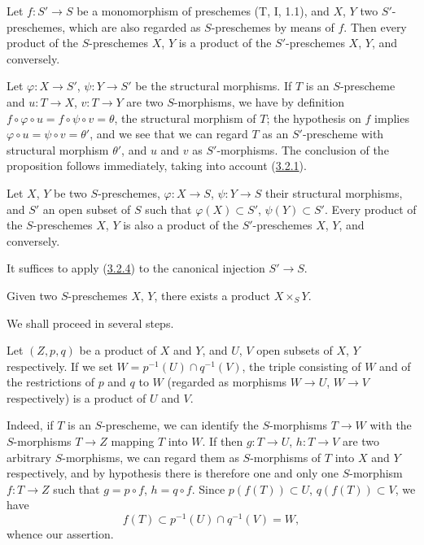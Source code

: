 \begin{proposition}[3.2.4]
\label{I.3.2.4}
Let $f:S'\to S$ be a monomorphism of preschemes (T, I, 1.1), and $X$, $Y$ two
$S'$-preschemes, which are also regarded as $S$-preschemes by means of
$f$. Then every product of the $S$-preschemes $X$, $Y$ is a product of the
$S'$-preschemes $X$, $Y$, and conversely.
\end{proposition}

Let $\varphi:X\to S'$, $\psi:Y\to S'$ be the structural morphisms. If $T$
is an $S$-prescheme and $u:T\to X$, $v:T\to Y$ are two $S$-morphisms, we have by
definition $f\circ\varphi\circ u=f\circ\psi\circ v=\theta$, the structural
morphism of $T$; the hypothesis on $f$ implies
$\varphi\circ u=\psi\circ v=\theta'$, and we see that we can regard $T$
as an $S'$-prescheme with structural morphism $\theta'$, and $u$ and $v$ as
$S'$-morphisms. The conclusion of the proposition follows immediately,
taking into account (\hyperref[I.3.2.1]{3.2.1}).

\begin{corollary}[3.2.5]
\label{I.3.2.5}
Let $X$, $Y$ be two $S$-preschemes, $\varphi:X\to S$, $\psi:Y\to S$ their
structural morphisms, and $S'$ an open subset of $S$ such that
$\varphi(X)\subset S'$, $\psi(Y)\subset S'$. Every product of the $S$-preschemes
$X$, $Y$ is also a product of the $S'$-preschemes $X$, $Y$, and conversely.
\end{corollary}

It suffices to apply (\hyperref[I.3.2.4]{3.2.4}) to the canonical injection
$S'\to S$.

\begin{theorem}[3.2.6]
\label{I.3.2.6}
Given two $S$-preschemes $X$, $Y$, there exists a product
$X\times_S Y$.
\end{theorem}

We shall proceed in several steps.

\begin{lemma}[3.2.6.1]
\label{I.3.2.6.1}
Let $(Z,p,q)$ be a product of $X$ and $Y$, and $U$, $V$ open subsets of
$X$, $Y$ respectively. If we set
$W=p^{-1}(U)\cap q^{-1}(V)$, the triple consisting of $W$ and of the restrictions
of $p$ and $q$ to $W$ \textup{(regarded as morphisms $W\to U$,
$W\to V$ respectively)} is a product of $U$ and $V$.
\end{lemma}

Indeed, if $T$ is an $S$-prescheme, we can identify the $S$-morphisms
$T\to W$ with the $S$-morphisms $T\to Z$ mapping $T$ into $W$. If then
$g:T\to U$, $h:T\to V$ are two arbitrary $S$-morphisms, we can
regard them as $S$-morphisms of $T$ into $X$ and $Y$ respectively, and
by hypothesis there is therefore one and only one $S$-morphism $f:T\to Z$ such
that $g=p\circ f$, $h=q\circ f$. Since $p(f(T))\subset U$, $q(f(T))\subset V$,
we have
\[
  f(T)\subset p^{-1}(U)\cap q^{-1}(V)=W,
\]
whence our assertion.

